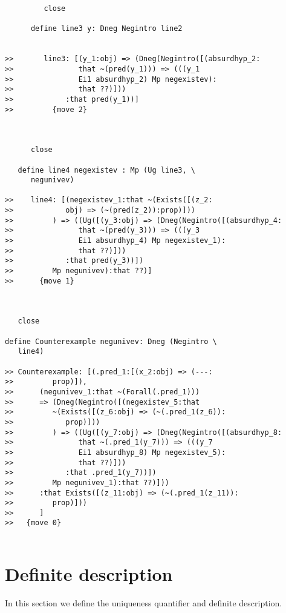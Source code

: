 \documentclass[12pt]{article}
\begin{document}
\begin{verbatim}
         close

      define line3 y: Dneg Negintro line2


>>       line3: [(y_1:obj) => (Dneg(Negintro([(absurdhyp_2:
>>               that ~(pred(y_1))) => (((y_1
>>               Ei1 absurdhyp_2) Mp negexistev):
>>               that ??)]))
>>            :that pred(y_1))]
>>         {move 2}



      close

   define line4 negexistev : Mp (Ug line3, \
      negunivev)

>>    line4: [(negexistev_1:that ~(Exists([(z_2:
>>            obj) => (~(pred(z_2)):prop)]))
>>         ) => ((Ug([(y_3:obj) => (Dneg(Negintro([(absurdhyp_4:
>>               that ~(pred(y_3))) => (((y_3
>>               Ei1 absurdhyp_4) Mp negexistev_1):
>>               that ??)]))
>>            :that pred(y_3))])
>>         Mp negunivev):that ??)]
>>      {move 1}



   close

define Counterexample negunivev: Dneg (Negintro \
   line4)

>> Counterexample: [(.pred_1:[(x_2:obj) => (---:
>>         prop)]),
>>      (negunivev_1:that ~(Forall(.pred_1)))
>>      => (Dneg(Negintro([(negexistev_5:that
>>         ~(Exists([(z_6:obj) => (~(.pred_1(z_6)):
>>            prop)]))
>>         ) => ((Ug([(y_7:obj) => (Dneg(Negintro([(absurdhyp_8:
>>               that ~(.pred_1(y_7))) => (((y_7
>>               Ei1 absurdhyp_8) Mp negexistev_5):
>>               that ??)]))
>>            :that .pred_1(y_7))])
>>         Mp negunivev_1):that ??)]))
>>      :that Exists([(z_11:obj) => (~(.pred_1(z_11)):
>>         prop)]))
>>      ]
>>   {move 0}


\end{verbatim}





\section{Definite description}

In this section we define the uniqueness quantifier and definite description.
\end{document}
